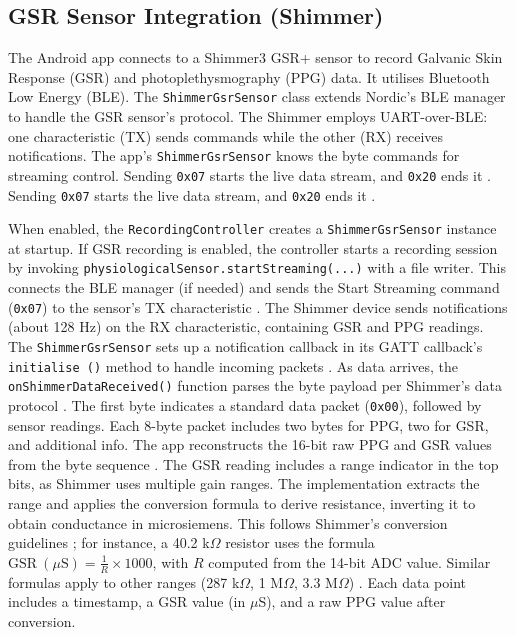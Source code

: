 \subsection{GSR Sensor Integration (Shimmer)}\label{sec:4-2-2}
The Android app connects to a Shimmer3 GSR+ sensor to record Galvanic Skin Response (GSR) and photoplethysmography (PPG) data. It utilises Bluetooth Low Energy (BLE). The \texttt{ShimmerGsrSensor} class extends Nordic's BLE manager to handle the GSR sensor's protocol. The Shimmer employs UART-over-BLE: one characteristic (TX) sends commands while the other (RX) receives notifications. The app's \texttt{ShimmerGsrSensor} knows the byte commands for streaming control. Sending \texttt{0x07} starts the live data stream, and \texttt{0x20} ends it \cite{ref15}. Sending \texttt{0x07} starts the live data stream, and \texttt{0x20} ends it \cite{ref15}.

When enabled, the \texttt{RecordingController} creates a \texttt{ShimmerGsrSensor} instance at startup. If GSR recording is enabled, the controller starts a recording session by invoking \texttt{physiologicalSensor.startStreaming(...)} with a file writer. This connects the BLE manager (if needed) and sends the Start Streaming command (\texttt{0x07}) to the sensor's TX characteristic \cite{ref15}. The Shimmer device sends notifications (about 128 Hz) on the RX characteristic, containing GSR and PPG readings. The \texttt{ShimmerGsrSensor} sets up a notification callback in its GATT callback's \texttt{initialise ()} method to handle incoming packets \cite{ref15}. As data arrives, the \texttt{onShimmerDataReceived()} function parses the byte payload per Shimmer's data protocol \cite{ref8}. The first byte indicates a standard data packet (\texttt{0x00}), followed by sensor readings. Each 8-byte packet includes two bytes for PPG, two for GSR, and additional info. The app reconstructs the 16-bit raw PPG and GSR values from the byte sequence \cite{ref8}. The GSR reading includes a range indicator in the top bits, as Shimmer uses multiple gain ranges. The implementation extracts the range and applies the conversion formula to derive resistance, inverting it to obtain conductance in microsiemens. This follows Shimmer's conversion guidelines \cite{ref8}; for instance, a 40.2 k$\Omega$ resistor uses the formula $\mathrm{GSR}\ (\mu\mathrm{S}) = \frac{1}{R} \times 1000$, with $R$ computed from the 14-bit ADC value. Similar formulas apply to other ranges (287 k$\Omega$, 1 M$\Omega$, 3.3 M$\Omega$) \cite{ref8}. Each data point includes a timestamp, a GSR value (in $\mu$S), and a raw PPG value after conversion.

